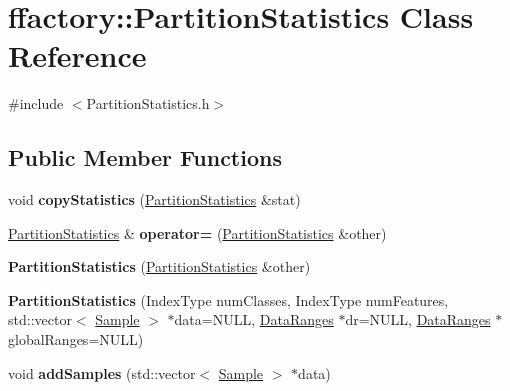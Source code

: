 \hypertarget{classffactory_1_1_partition_statistics}{\section{ffactory\-:\-:Partition\-Statistics Class Reference}
\label{classffactory_1_1_partition_statistics}
}


{\ttfamily \#include $<$Partition\-Statistics.\-h$>$}

\subsection*{Public Member Functions}
\begin{DoxyCompactItemize}
\item 
\hypertarget{classffactory_1_1_partition_statistics_afc85cfef9d4853d5ea8995329daa641e}{void {\bfseries copy\-Statistics} (\hyperlink{classffactory_1_1_partition_statistics}{Partition\-Statistics} \&stat)}\label{classffactory_1_1_partition_statistics_afc85cfef9d4853d5ea8995329daa641e}

\item 
\hypertarget{classffactory_1_1_partition_statistics_a0a7ab8fec6d7825f3fd1c86c110b8cb1}{\hyperlink{classffactory_1_1_partition_statistics}{Partition\-Statistics} \& {\bfseries operator=} (\hyperlink{classffactory_1_1_partition_statistics}{Partition\-Statistics} \&other)}\label{classffactory_1_1_partition_statistics_a0a7ab8fec6d7825f3fd1c86c110b8cb1}

\item 
\hypertarget{classffactory_1_1_partition_statistics_ac51554ea5f08d0277dd69d6878b7a928}{{\bfseries Partition\-Statistics} (\hyperlink{classffactory_1_1_partition_statistics}{Partition\-Statistics} \&other)}\label{classffactory_1_1_partition_statistics_ac51554ea5f08d0277dd69d6878b7a928}

\item 
\hypertarget{classffactory_1_1_partition_statistics_a7180a6a215b82b62f836994fe5a0832c}{{\bfseries Partition\-Statistics} (Index\-Type num\-Classes, Index\-Type num\-Features, std\-::vector$<$ \hyperlink{classffactory_1_1_sample}{Sample} $>$ $\ast$data=N\-U\-L\-L, \hyperlink{classffactory_1_1_data_ranges}{Data\-Ranges} $\ast$dr=N\-U\-L\-L, \hyperlink{classffactory_1_1_data_ranges}{Data\-Ranges} $\ast$global\-Ranges=N\-U\-L\-L)}\label{classffactory_1_1_partition_statistics_a7180a6a215b82b62f836994fe5a0832c}

\item 
\hypertarget{classffactory_1_1_partition_statistics_a30876f6676c6aee2060f5657261df141}{void {\bfseries add\-Samples} (std\-::vector$<$ \hyperlink{classffactory_1_1_sample}{Sample} $>$ $\ast$data)}\label{classffactory_1_1_partition_statistics_a30876f6676c6aee2060f5657261df141}


\end{DoxyCompactItemize}
